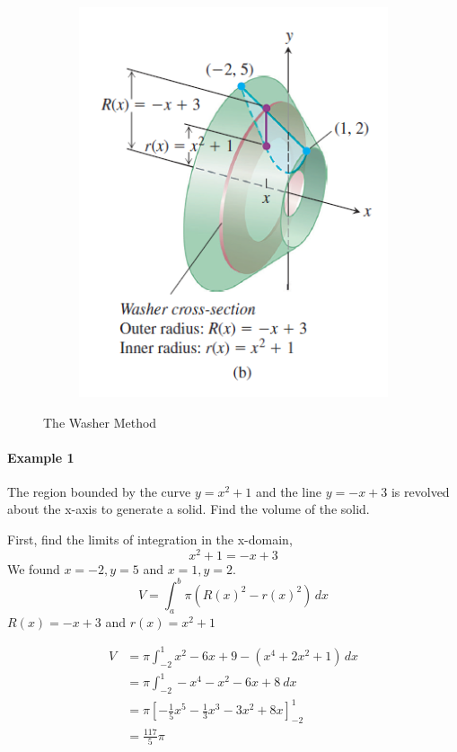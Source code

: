\documentclass[12pt]{article}
\begin{document}
\begin{figure}[H]
\begin{subfigure}[b]{0.25\linewidth}
       \includegraphics[width = 1\linewidth]{Images/washer method 2.png}
  \end{subfigure}
  \caption{The Washer Method}
\end{figure}

\paragraph{Example 1} The region bounded by the curve $y = x^2 + 1$ and the line $y = -x + 3$
is revolved about the x-axis to generate a solid. Find the volume of the solid.

First, find the limits of integration in the x-domain,
\[
    x^2 + 1= - x + 3
\]
We found $x = -2, y = 5$ and $x = 1, y = 2$.
\[
    V = \int_a^b \pi (R(x)^2 - r(x)^2)\, dx
\]
$R(x) = -x + 3$ and $r(x) = x^2 + 1$

\begin{align*} 
     V &= \pi \int_{ - 2}^{1} x^2 - 6x + 9 - (x^4 + 2x^2 + 1)\, dx \\
    &= \pi \int_{ - 2}^{1} - x^4 - x^2 - 6x + 8\: dx \\
    &= \pi \left[ - \frac{1}{5}x^5 - \frac{1}{3} x^3 - 3x^2 + 8x \right]^1_{ - 2} \\
    &= \frac{117}{5} \pi
\end{align*}
\end{document}
